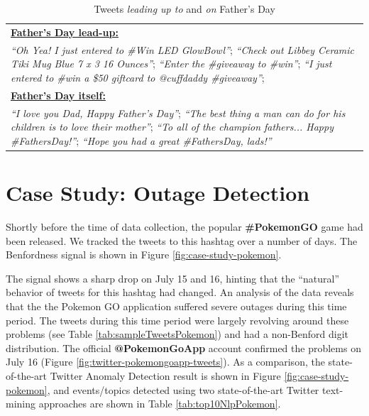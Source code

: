 \documentclass[twoside,leqno,twocolumn]{article}\usepackage[]{graphicx}\usepackage[]{color}
\begin{document}
\begin{table}[h!]
  \footnotesize
  \centering
  \begin{tabular}{|p{8cm}|}
    \hline
    \textbf{\underline{Father's Day lead-up:}} \\
    \textit{``Oh Yea! I just entered to \#Win LED GlowBowl''}; \textit{``Check out Libbey Ceramic Tiki Mug Blue 7 x 3 16 Ounces''}; \textit{``Enter the \#giveaway to \#win''}; \textit{``I just entered to \#win a \$50 giftcard to @cuffdaddy \#giveaway''}; \\
    \textbf{\underline{Father's Day itself:}} \\
    \textit{``I love you Dad, Happy Father's Day''}; \textit{``The best thing a man can do for his children is to love their mother''}; \textit{``To all of the champion fathers... Happy \#FathersDay!''}; \textit{``Hope you had a great \#FathersDay, lads!''}  \\
    \hline
  \end{tabular}
  \caption{Tweets \textit{leading up to} and \textit{on} Father's Day}
  \label{tab:sampleTweetsFathersDayLeadUp}
\end{table}


\section{Case Study: Outage Detection}
\label{sec:case-study:-outag}

Shortly before the time of data collection, the popular \textbf{\#PokemonGO} game had been released. We tracked the tweets to this hashtag over a number of days. The Benfordness signal is shown in Figure \ref{fig:case-study-pokemon}.

The signal shows a sharp drop on July 15 and 16, hinting that the ``natural'' behavior of tweets for this hashtag had changed. An analysis of the data reveals that the the Pokemon GO application suffered severe outages during this time period. The tweets during this time period were largely revolving around these problems (see Table \ref{tab:sampleTweetsPokemon}) and had a non-Benford digit distribution. The official \textbf{@PokemonGoApp} account confirmed the problems on July 16 (Figure \ref{fig:twitter-pokemongoapp-tweets}). As a comparison, the state-of-the-art Twitter Anomaly Detection result is shown in Figure \ref{fig:case-study-pokemon}, and events/topics detected using two state-of-the-art Twitter text-mining approaches are shown in Table \ref{tab:top10NlpPokemon}.
\end{document}
